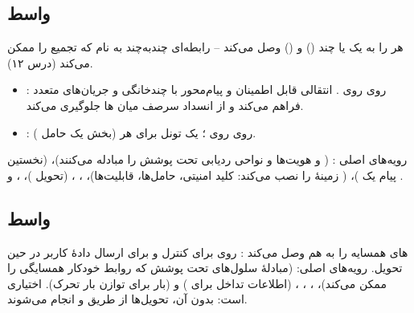 \documentclass[11pt,a4paper]{article}
\begin{document}
\begin{acnfigure}
  \caption{نگاشت اصلی کانال‌های . تقریباً همهٔ کانال‌های منطقی به کانال‌های مشترک می‌رسند؛
   و  کنترل لایهٔ ۱/۲ را بدون کانال انتقال حمل می‌کنند.}
  \label{fig:channels}
\end{acnfigure}

\subsection{واسط }
 هر  را به یک یا چند  () و  () وصل می‌کند -- رابطه‌ای
چندبه‌چند به نام \emph{} که تجمیع  را ممکن می‌کند (درس ۱۲).
\begin{itemize}
  \item \textbf{}:  روی  روی  \cite{ts36413}.  انتقالی قابل
        اطمینان و پیام‌محور با چندخانگی و جریان‌های متعدد فراهم می‌کند و از انسداد سرصف میان ها
        جلوگیری می‌کند.
  \item \textbf{}:  روی  روی ؛ یک تونل برای هر  (بخش  یک حامل ).
\end{itemize}
رویه‌های اصلی : \emph{} ( و  هویت‌ها و نواحی ردیابی تحت پوشش را مبادله
می‌کنند)، \emph{} (نخستین پیام  یک )، \emph{}
( زمینهٔ  را نصب می‌کند: کلید امنیتی، حامل‌ها، قابلیت‌ها)، \emph{}،
\emph{}، \emph{} (تحویل )، \emph{}،
\emph{} و \emph{}.

\subsection{واسط }
 های همسایه را به هم وصل می‌کند \cite{ts36423}:  روی  برای کنترل و
 برای ارسال دادهٔ کاربر در حین تحویل. رویه‌های اصلی: \emph{} (مبادلهٔ سلول‌های تحت
پوشش که روابط خودکار همسایگی را ممکن می‌کند)، \emph{}، \emph{}،
\emph{}، \emph{} (اطلاعات تداخل برای ) و
\emph{} (بار برای توازن بار تحرک).  اختیاری است: بدون آن، تحویل‌ها از
طریق  و  انجام می‌شوند.
\end{document}
